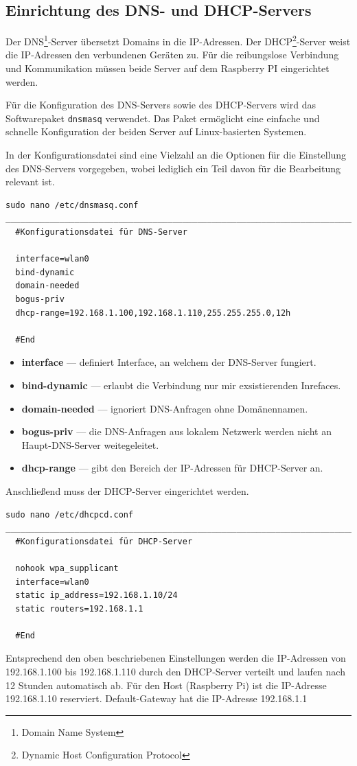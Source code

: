 \documentclass[12pt, letterpaper]{article}
\begin{document}
\subsection{Einrichtung des DNS- und DHCP-Servers}
\par Der DNS\footnote[4]{Domain Name System}-Server übersetzt Domains in die IP-Adressen. Der DHCP\footnote[5]{Dynamic Host Configuration Protocol}-Server weist die IP-Adressen den verbundenen Geräten zu. Für die reibungslose Verbindung und Kommunikation müssen beide Server auf dem Raspberry PI eingerichtet werden.
\par Für die Konfiguration des DNS-Servers sowie des DHCP-Servers wird das Softwarepaket \texttt{dnsmasq} verwendet. Das Paket ermöglicht eine einfache und schnelle Konfiguration der beiden Server auf Linux-basierten Systemen.
\par In der Konfigurationsdatei sind eine Vielzahl an die Optionen für die Einstellung des DNS-Servers vorgegeben, wobei lediglich ein Teil davon für die Bearbeitung relevant ist.
\begin{Verbatim}[frame=single]
  sudo nano /etc/dnsmasq.conf
_____________________________________________________________________________
  #Konfigurationsdatei für DNS-Server

  interface=wlan0
  bind-dynamic
  domain-needed
  bogus-priv
  dhcp-range=192.168.1.100,192.168.1.110,255.255.255.0,12h

  #End
\end{Verbatim}
\begin{itemize}
  \item[\textbullet] \textbf{interface} --- definiert Interface, an welchem der DNS-Server fungiert.
  \item[\textbullet] \textbf{bind-dynamic} --- erlaubt die Verbindung nur mir exsistierenden Inrefaces.
  \item[\textbullet] \textbf{domain-needed} --- ignoriert DNS-Anfragen ohne Domänennamen. 
  \item[\textbullet] \textbf{bogus-priv} --- die DNS-Anfragen aus lokalem Netzwerk werden nicht an Haupt-DNS-Server weitegeleitet.
  \item[\textbullet] \textbf{dhcp-range} --- gibt den Bereich der IP-Adressen für DHCP-Server an.
\end{itemize}
\par Anschließend muss der DHCP-Server eingerichtet werden.
\begin{Verbatim}[frame=single]
  sudo nano /etc/dhcpcd.conf
_____________________________________________________________________________
  #Konfigurationsdatei für DHCP-Server

  nohook wpa_supplicant
  interface=wlan0
  static ip_address=192.168.1.10/24
  static routers=192.168.1.1

  #End
\end{Verbatim}
\par Entsprechend den oben beschriebenen Einstellungen werden die IP-Adressen von 192.168.1.100 bis 192.168.1.110 durch den DHCP-Server verteilt und laufen nach 12 Stunden automatisch ab. Für den Host (Raspberry Pi) ist die IP-Adresse 192.168.1.10 reserviert. Default-Gateway hat die IP-Adresse 192.168.1.1 
\end{document}
